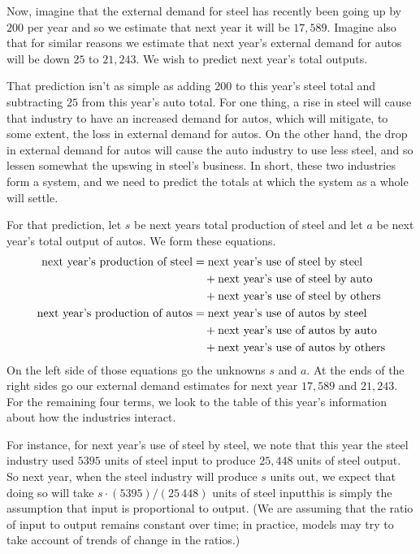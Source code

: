 Now, imagine that the external demand for steel has recently been going up by
$200$ per year and so we estimate that next year it will be $17,589$.
Imagine also that for similar reasons we estimate that next year's 
external demand for autos will be down $25$ to $21,243$.
We wish to predict next year's total outputs.

That prediction isn't as simple as adding $200$ to this year's steel
total and subtracting $25$ from this year's auto total.
For one thing, a rise in steel will cause
that industry to have an increased demand for autos, which will mitigate,
to some extent, the loss in external demand for autos.
On the other hand, the drop in external demand for autos will cause
the auto industry to use less steel, and so lessen somewhat the
upswing in steel's business.
In short, these two industries form a system, 
and we need to predict the totals at which the system as a whole will settle.

For that prediction, let $s$ be next years total production of steel and
let $a$ be next year's total output of autos.
We form these equations.
\begin{align*}
  \text{next year's production of steel}
     &=\text{next year's use of steel by steel}   \\
     &\quad\hbox{}+\text{next year's use of steel by auto}  \\             
     &\quad\hbox{}+\text{next year's use of steel by others} \\
  \text{next year's production of autos}
     &=\text{next year's use of autos by steel}   \\
     &\quad\hbox{}+\text{next year's use of autos by auto}  \\             
     &\quad\hbox{}+\text{next year's use of autos by others} 
\end{align*}
On the left side of those equations go the unknowns $s$ and $a$.
At the ends of the right sides go our external demand estimates for next 
year $17,589$ and $21,243$.
For the remaining four terms, we look to the table of this year's information
about how the industries interact.

For instance, for next year's use of steel by steel, we note that this year the
steel industry used $5395$ units of steel input to produce $25,448$ units of
steel output.
So next year, when the steel industry will produce $s$ units out, 
we expect that doing so will take $s\cdot (5395)/(25\,448)$
units of steel input\Dash this is simply the assumption that input is
proportional to output. 
(We are assuming that the ratio of input to output remains constant over time;
in practice, models may try to take account of trends of change in the
ratios.)

